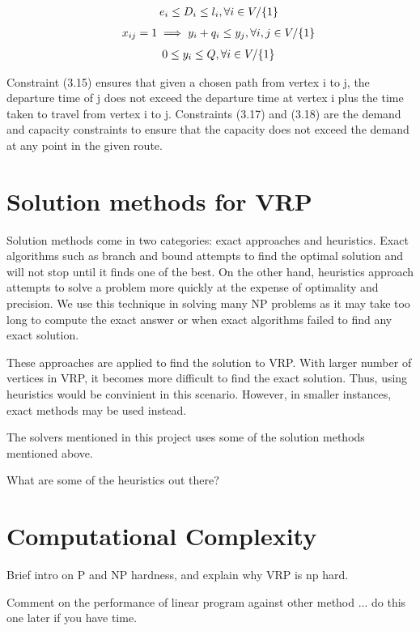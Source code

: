 \begin{equation}
    \begin{array}{ll@{}ll@{}ll}
        & e_{i} \leq D_{i} \leq l_{i}, \forall i \in V / \{1\}
    \end{array}
\end{equation}
\begin{equation}
    \begin{array}{ll@{}ll@{}ll}
        & x_{ij} = 1 \implies y_{i} + q_{i} \leq y_{j}, \forall i, j \in V / \{1\}
    \end{array}
\end{equation}
\begin{equation}
    \begin{array}{ll@{}ll@{}ll}
        & 0 \leq y_{i} \leq Q, \forall i \in V / \{1\}
    \end{array}
\end{equation}

\vspace{1cm}

Constraint (3.15) ensures that given a chosen path from vertex i to j, the departure time of j does not exceed the
departure time at vertex i plus the time taken to travel from vertex i to j. Constraints (3.17) and (3.18) are the
demand and capacity constraints to ensure that the capacity does not exceed the demand at any point in the given route.

\section{Solution methods for VRP}
Solution methods come in two categories: exact approaches and heuristics. Exact algorithms such as branch and bound attempts
to find the optimal solution and will not stop until it finds one of the best. On the other hand, heuristics approach
 attempts to solve a problem more quickly at the expense of optimality and precision. We use this technique in
solving many NP problems as it may take too long to compute the exact answer or when exact algorithms failed to find any exact solution.

These approaches are applied to find the solution to VRP. With larger number of vertices in VRP, it becomes more difficult
to find the exact solution. Thus, using heuristics would be convinient in this scenario. However, in smaller instances,
exact methods may be used instead.

The solvers mentioned in this project uses some of the solution methods mentioned above.

What are some of the heuristics out there?

\section{Computational Complexity}
Brief intro on P and NP hardness, and explain why VRP is np hard.

Comment on the performance of linear program against other method
... do this one later if you have time.